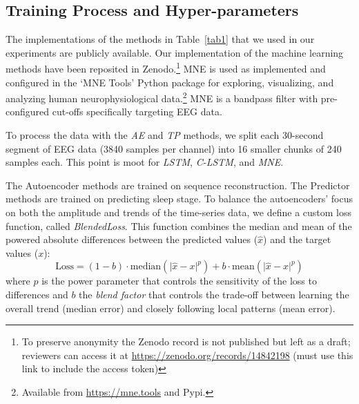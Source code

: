 \documentclass[runningheads]{llncs}
\begin{document}
\subsection{Training Process and Hyper-parameters}

The implementations of the methods in Table~\ref{tab1} that we used in
our experiments are publicly available. Our implementation of the
machine learning methods have been reposited in Zenodo.\footnote{To preserve
  anonymity the Zenodo record is not published but left as a draft;
  reviewers can access it at
  \href{https://zenodo.org/records/14842198?preview=1&token=eyJhbGciOiJIUzUxMiJ9.eyJpZCI6IjNjMWE3YTg3LTM4MzgtNGNlMC1hNDE4LTJjMWJlMjU5YjA3NyIsImRhdGEiOnt9LCJyYW5kb20iOiJiODVmNmVhMDE1NjczMThjNjI2MTI1ODQyZTExOWIxMiJ9.o4gCR2U_bkKruC97ZdexHkU7iVI2q28Cx_0tD8xkPjGyjoPdWNqsASLj62O0hhfdoFxliJFKKrQdrAWVoeLcXw}{https://zenodo.org/records/14842198} (must use this link to include the access token)}
MNE is used as implemented and configured in the `MNE Tools' Python
package for exploring, visualizing, and analyzing human
neurophysiological data.\footnote{Available from \url{https://mne.tools} and Pypi.}
MNE is a bandpass filter with pre-configured cut-offs specifically
targeting EEG data.

To process the data with the \emph{AE} and \emph{TP} methods, we split
each 30-second segment of EEG data (3840 samples per channel) into 16
smaller chunks of 240 samples each. This point is moot for \emph{LSTM},
\emph{C-LSTM}, and \emph{MNE}.

The Autoencoder methods are trained on sequence reconstruction. The
Predictor methods are trained on predicting sleep stage.
%
To balance the autoencoders' focus on both the amplitude and trends of the
time-series data, we define a custom loss function, called
\emph{BlendedLoss}. This function combines the median and mean of the
powered absolute differences between the predicted values ($\hat{x}$)
and the target values ($x$):
%
$$
\text{Loss} =
  (1 - b)\cdot\mathrm{median}(\lvert \hat{x} - x \rvert^p) +
  b\cdot\mathrm{mean}(\lvert \hat{x} - x \rvert^p)
$$
%
where $p$ is the power parameter that controls the sensitivity of the
loss to differences and $b$ the \emph{blend factor} that controls
the trade-off between learning the overall trend (median error) and
closely following local patterns (mean error).
\end{document}
